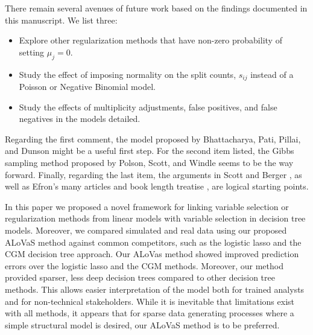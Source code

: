 There remain several avenues of future work based on the findings documented in this manuscript. We list three:

\begin{itemize}
\item Explore other regularization methods that have non-zero probability of setting $\mu_j=0$. 
\item Study the effect of imposing normality on the split counts, $s_{ij}$ instead of a Poisson or Negative Binomial model. 
\item Study the effects of multiplicity adjustments, false positives, and false negatives in the models detailed. 
\end{itemize}

Regarding the first comment, the model proposed by Bhattacharya, Pati, Pillai, and Dunson \cite{bhattacharya2012bayesian} might be a useful first step. For the second item listed, the Gibbs sampling method proposed by Polson, Scott, and Windle \cite{polson2013bayesian} seems to be the way forward. Finally, regarding the last item, the arguments in Scott and Berger \cite{scott2010bayes}, as well as Efron's many articles and book length treatise \cite{efron2009empirical,efron2004large,efron2007correlation,efron2010large}, are logical starting points. 

In this paper we proposed a novel framework for linking variable selection or regularization methods from linear models with variable selection in decision tree models. Moreover, we compared simulated and real data using our proposed ALoVaS method against common competitors, such as the logistic lasso and the CGM decision tree approach. Our ALoVas method showed improved prediction errors over the logistic lasso and the CGM methods. Moreover, our method provided sparser, less deep decision trees compared to other decision tree methods. This allows easier interpretation of the model both for trained analysts and for non-technical stakeholders. While it is inevitable that limitations exist with all methods, it appears that for sparse data generating processes where a simple structural model is desired, our ALoVaS method is to be preferred.  
